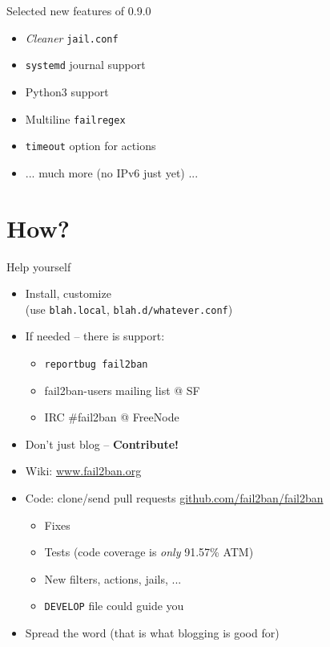 \documentclass[]{beamer}
\begin{document}
\begin{frame}{Selected new features of 0.9.0}
\begin{itemize}
\item \emph{Cleaner} \texttt{jail.conf}
\item \texttt{systemd} journal support
\item Python3 support
\item Multiline \texttt{failregex}
\item \texttt{timeout} option for actions
\item ... much more (no IPv6 just yet) ...
\end{itemize}
\end{frame}

\section{How?}

\begin{frame}[fragile]{Help yourself }
  \begin{itemize}
    \item Install, customize\\
      (use \texttt{blah.local}, \texttt{blah.d/whatever.conf})
    \item If needed -- there is support:
      \begin{itemize}
      \item \texttt{reportbug fail2ban}
      \item fail2ban-users mailing list @ SF
      \item IRC \#fail2ban @ FreeNode \pause
      \end{itemize}
    \item \alert{Don't just blog -- \textbf{Contribute!}}
    \item Wiki: \href{http://www.fail2ban.org}{www.fail2ban.org}
    \item Code: clone/send pull requests
      \href{http://github.com/fail2ban/fail2ban/pulls}{github.com/fail2ban/fail2ban}
      \begin{itemize}
      \item Fixes
      \item Tests (code coverage is \emph{only} 91.57\% ATM)
      \item New filters, actions, jails, ...
      \item \texttt{DEVELOP} file could guide you
      \end{itemize}
  \item Spread the word (\alert{that is what blogging is good for})
  \end{itemize}
\end{frame}
\end{document}
